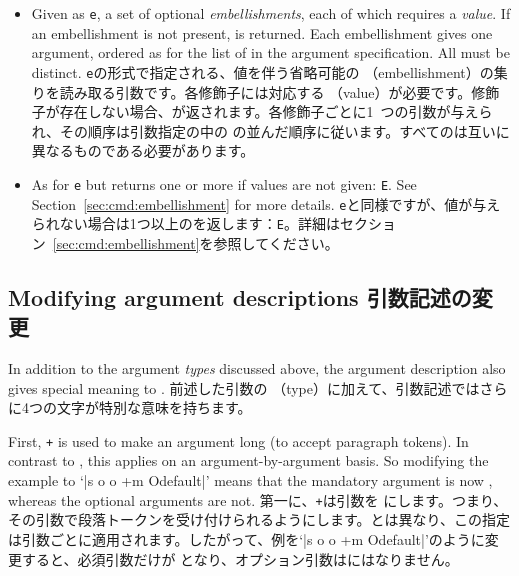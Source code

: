 \documentclass{ltxguide}
\newcommand\jpnewline{\vspace{3pt}\newline}
\DeclareRobustCommand{\jpemph}[1]{%
  \underLine{#1}%
}
\begin{document}
\begin{itemize}
  \item[\texttt{e}] Given as \texttt{e}, a set of optional
    \emph{embellishments}, each of which requires a \emph{value}.
    If an embellishment is not present,  is returned.  Each
    embellishment gives one argument, ordered as for the list of
     in the argument specification.  All 
    must be distinct.
\jpnewline    
 \texttt{e}の形式で指定される、値を伴う省略可能の\jpemph{修飾子}（embellishment）の集りを読み取る引数です。各修飾子には対応する \jpemph{値}（value）が必要です。修飾子が存在しない場合、が返されます。各修飾子ごとに1~つの引数が与えられ、その順序は引数指定の中の の並んだ順序に従います。すべてのは互いに異なるものである必要があります。 
  \item[\texttt{E}] As for \texttt{e} but returns one or more 
    if values are not given: \texttt{E}. See
    Section~\ref{sec:cmd:embellishment} for more details.
\jpnewline 
 \texttt{e}と同様ですが、値が与えられない場合は1つ以上のを返します：\texttt{E}。詳細はセクション~\ref{sec:cmd:embellishment}を参照してください。
\end{itemize}

\subsection{Modifying argument descriptions
引数記述の変更}

In addition to the argument \emph{types} discussed above, the argument
description also gives special meaning to .
\jpnewline
前述した引数の\jpemph{型}（type）に加えて、引数記述ではさらに4つの文字が特別な意味を持ちます。


First, \texttt{+} is used to make an argument long (to accept paragraph
tokens). In contrast to , this applies on an
argument-by-argument basis. So modifying the example to `|s o o +m O{default}|'
means that the mandatory argument is now , whereas the optional
arguments are not.
\jpnewline
第一に、\texttt{+}は引数を にします。つまり、その引数で段落トークンを受け付けられるようにします。とは異なり、この指定は引数ごとに適用されます。したがって、例を`|s o o +m O{default}|'のように変更すると、必須引数だけが となり、オプション引数はにはなりません。
\end{document}
